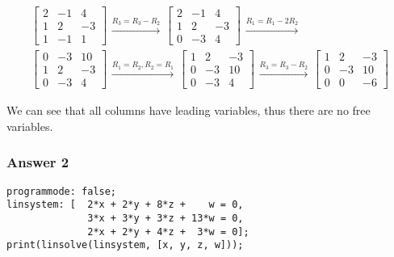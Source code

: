\documentclass[11pt]{article}
\begin{document}
\begin{align*}
  \begin{bmatrix}
    2 & -1 & 4 \\
    1 & 2  & -3 \\
    1 & -1 & 1
  \end{bmatrix}
  \begin{aligned} \xrightarrow{R_3 = R_3 - R_2} \end{aligned}
  \begin{bmatrix}
    2 & -1 & 4 \\
    1 & 2  & -3 \\
    0 & -3 & 4
  \end{bmatrix}
  \begin{aligned} \xrightarrow{R_1 = R_1 - 2R_2} \end{aligned} \\
  \begin{bmatrix}
    0 & -3 & 10 \\
    1 & 2  & -3 \\
    0 & -3 & 4
  \end{bmatrix}
  \begin{aligned} \xrightarrow{R_1 = R_2, R_2 = R_1} \end{aligned}
  \begin{bmatrix}
    1 & 2  & -3 \\
    0 & -3 & 10 \\
    0 & -3 & 4
  \end{bmatrix}
  \begin{aligned} \xrightarrow{R_3 = R_3 - R_2} \end{aligned}
  \begin{bmatrix}
    1 & 2  & -3 \\
    0 & -3 & 10 \\
    0 & 0 & -6
  \end{bmatrix}
\end{align*}

We can see that all columns have leading variables, thus there are no free
variables.

\subsubsection{Answer 2}
\label{sec:orgheadline2}

\begin{verbatim}
programmode: false;
linsystem: [  2*x + 2*y + 8*z +    w = 0,
              3*x + 3*y + 3*z + 13*w = 0,
              2*x + 2*y + 4*z +  3*w = 0];
print(linsolve(linsystem, [x, y, z, w]));
\end{verbatim}
\end{document}
